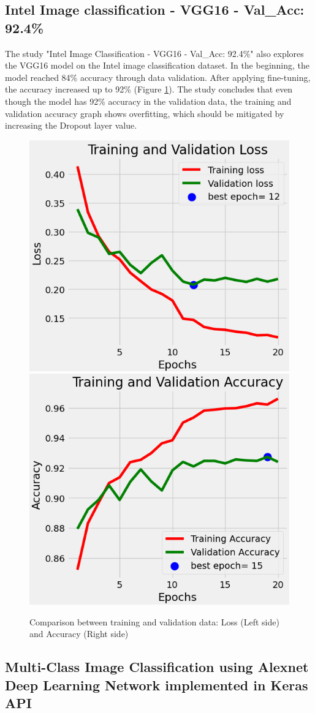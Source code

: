 \documentclass[conference]{IEEEtran}
\begin{document}
\subsection{Intel Image classification - VGG16 - Val\_Acc: 92.4\%}

The study "Intel Image Classification - VGG16 - Val\_Acc: 92.4\%" \cite{VGG16Tuning} also explores the VGG16 model on the Intel image classification dataset. In the beginning, the model reached 84\% accuracy through data validation. After applying fine-tuning, the accuracy increased up to 92\% (Figure \ref{fig:VGG1692}). The study concludes that even though the model has 92\% accuracy in the validation data, the training and validation accuracy graph shows overfitting, which should be mitigated by increasing the Dropout layer value.

\begin{figure}[H]
    \centering
    \includegraphics[width=0.45\linewidth]{images/stateOfTheArt/vgg1692Loss.png}
    \quad
    \includegraphics[width=0.45\linewidth]{images/stateOfTheArt/vgg1692Acc.png}
    \caption{Comparison between training and validation data: Loss (Left side) and Accuracy (Right side) \cite{VGG16Tuning}}
    \label{fig:VGG1692}
\end{figure}

\subsection{Multi-Class Image Classification using Alexnet Deep Learning Network implemented in Keras API}
\end{document}

